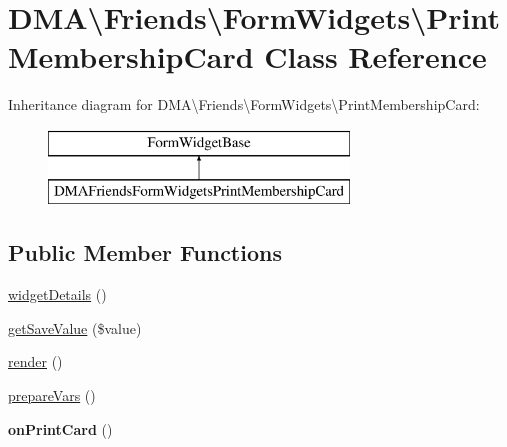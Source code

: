\hypertarget{classDMA_1_1Friends_1_1FormWidgets_1_1PrintMembershipCard}{}\section{D\+M\+A\textbackslash{}Friends\textbackslash{}Form\+Widgets\textbackslash{}Print\+Membership\+Card Class Reference}
\label{classDMA_1_1Friends_1_1FormWidgets_1_1PrintMembershipCard}
Inheritance diagram for D\+M\+A\textbackslash{}Friends\textbackslash{}Form\+Widgets\textbackslash{}Print\+Membership\+Card\+:\begin{figure}[H]
\begin{center}
\leavevmode
\includegraphics[height=2.000000cm]{dd/daf/classDMA_1_1Friends_1_1FormWidgets_1_1PrintMembershipCard}
\end{center}
\end{figure}
\subsection*{Public Member Functions}
\begin{DoxyCompactItemize}
\item 
\hyperlink{classDMA_1_1Friends_1_1FormWidgets_1_1PrintMembershipCard_a61fed2675f8a9c82aeca689e2b830398}{widget\+Details} ()
\item 
\hyperlink{classDMA_1_1Friends_1_1FormWidgets_1_1PrintMembershipCard_aca62e175104a7666f52536e39e82f04c}{get\+Save\+Value} (\$value)
\item 
\hyperlink{classDMA_1_1Friends_1_1FormWidgets_1_1PrintMembershipCard_a8c4f95cd05d67d9df92e63b0b7a80603}{render} ()
\item 
\hyperlink{classDMA_1_1Friends_1_1FormWidgets_1_1PrintMembershipCard_a4e196d8afe047a8c570e3ae70fba5959}{prepare\+Vars} ()
\item 
\hypertarget{classDMA_1_1Friends_1_1FormWidgets_1_1PrintMembershipCard_a6cdc323921452cf7ccd3e8642be7109f}{}{\bfseries on\+Print\+Card} ()\label{classDMA_1_1Friends_1_1FormWidgets_1_1PrintMembershipCard_a6cdc323921452cf7ccd3e8642be7109f}

\end{DoxyCompactItemize}
